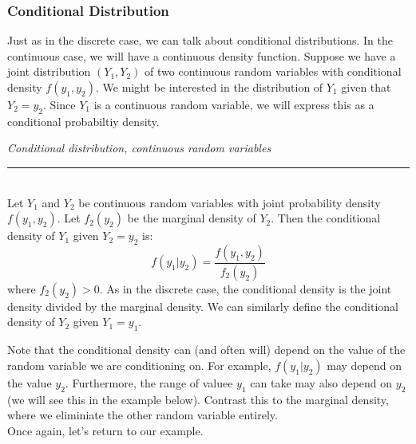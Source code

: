 \documentclass[12pt]{article}
\theoremstyle{definition}
\theoremstyle{remark}
\begin{document}
\subsubsection{Conditional Distribution}
Just as in the discrete case, we can talk about conditional distributions. In the continuous case, we will have a continuous density function. Suppose we have a joint distribution $(Y_1, Y_2)$ of two continuous random variables with conditional density $f(y_1, y_2)$. We might be interested in the distribution of $Y_1$ given that $Y_2 = y_2$. Since $Y_1$ is a continuous random variable, we will express this as a conditional probabiltiy density.\\

\begin{framed}
\emph{Conditional distribution, continuous random variables}\\
  \rule{\dimexpr{}\fboxrule}{.1pt} \\
Let $Y_1$ and $Y_2$ be continuous random variables with joint probability density $f(y_1, y_2)$. Let $f_2(y_2)$ be the marginal density of $Y_2$. Then the conditional density of $Y_1$ given $Y_2 = y_2$ is:
\[
f(y_1|y_2) = \frac{f(y_1, y_2)}{f_2(y_2)}
\]
where $f_2(y_2) > 0$. As in the discrete case, the conditional density is the joint density divided by the marginal density. We can similarly define the conditional density of $Y_2$ given $Y_1 = y_1$.
\end{framed}
Note that the conditional density can (and often will) depend on the value of the random variable we are conditioning on. For example, $f(y_1|y_2)$ may depend on the value $y_2$. Furthermore, the range of valuee $y_1$ can take may also depend on $y_2$ (we will see this in the example below). Contrast this to the marginal density, where we eliminiate the other random variable entirely.\\

Once again, let's return to our example.
\end{document}
